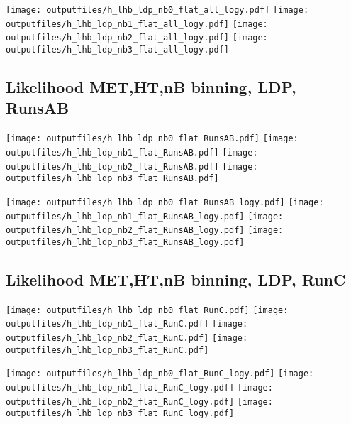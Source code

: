 \documentclass[11pt]{article}
\begin{document}
    \noindent
     \texttt{[image: outputfiles/h\_lhb\_ldp\_nb0\_flat\_all\_logy.pdf]}
     \texttt{[image: outputfiles/h\_lhb\_ldp\_nb1\_flat\_all\_logy.pdf]}
     \texttt{[image: outputfiles/h\_lhb\_ldp\_nb2\_flat\_all\_logy.pdf]}
     \texttt{[image: outputfiles/h\_lhb\_ldp\_nb3\_flat\_all\_logy.pdf]}

   \clearpage

    \subsection{ Likelihood MET,HT,nB binning, LDP, RunsAB}

    \noindent
     \texttt{[image: outputfiles/h\_lhb\_ldp\_nb0\_flat\_RunsAB.pdf]}
     \texttt{[image: outputfiles/h\_lhb\_ldp\_nb1\_flat\_RunsAB.pdf]}
     \texttt{[image: outputfiles/h\_lhb\_ldp\_nb2\_flat\_RunsAB.pdf]}
     \texttt{[image: outputfiles/h\_lhb\_ldp\_nb3\_flat\_RunsAB.pdf]}

    \noindent
     \texttt{[image: outputfiles/h\_lhb\_ldp\_nb0\_flat\_RunsAB\_logy.pdf]}
     \texttt{[image: outputfiles/h\_lhb\_ldp\_nb1\_flat\_RunsAB\_logy.pdf]}
     \texttt{[image: outputfiles/h\_lhb\_ldp\_nb2\_flat\_RunsAB\_logy.pdf]}
     \texttt{[image: outputfiles/h\_lhb\_ldp\_nb3\_flat\_RunsAB\_logy.pdf]}

   \clearpage

    \subsection{ Likelihood MET,HT,nB binning, LDP, RunC}

    \noindent
     \texttt{[image: outputfiles/h\_lhb\_ldp\_nb0\_flat\_RunC.pdf]}
     \texttt{[image: outputfiles/h\_lhb\_ldp\_nb1\_flat\_RunC.pdf]}
     \texttt{[image: outputfiles/h\_lhb\_ldp\_nb2\_flat\_RunC.pdf]}
     \texttt{[image: outputfiles/h\_lhb\_ldp\_nb3\_flat\_RunC.pdf]}

    \noindent
     \texttt{[image: outputfiles/h\_lhb\_ldp\_nb0\_flat\_RunC\_logy.pdf]}
     \texttt{[image: outputfiles/h\_lhb\_ldp\_nb1\_flat\_RunC\_logy.pdf]}
     \texttt{[image: outputfiles/h\_lhb\_ldp\_nb2\_flat\_RunC\_logy.pdf]}
     \texttt{[image: outputfiles/h\_lhb\_ldp\_nb3\_flat\_RunC\_logy.pdf]}
\end{document}
